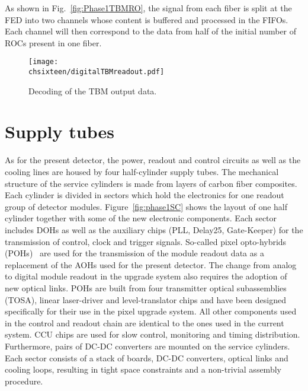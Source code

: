 As shown in Fig.~\ref{fig:Phase1TBMRO}, the signal from each fiber is split at the FED into two channels whose content is buffered and processed in the FIFOs.
Each channel will then correspond to the data from half of the initial number of ROCs present in one fiber.

\clearpage

\begin{figure}[!htb]
 \begin{center}
 \texttt{[image: \\chsixteen/digitalTBMreadout.pdf]}
 \end{center}
 \caption{Decoding of the TBM output data.}
 \label{fig:digTBMRO}
\end{figure}

\section{Supply tubes}

As for the present detector, the power, readout and control circuits as well as the cooling lines are housed by four half-cylinder supply tubes.
The mechanical structure of the service cylinders is made from layers of carbon fiber composites.
Each cylinder is divided in sectors which hold the electronics for one readout group of detector modules.
Figure~\ref{fig:phase1SC} shows the layout of one half cylinder together with some of the new electronic components.
Each sector includes DOHs as well as the auxiliary chips (PLL, Delay25, Gate-Keeper) for the transmission of control, clock and trigger signals.
So-called pixel opto-hybrids (POHs)~\cite{1748-0221-7-01-C01113} are used for the transmission of the module readout data as a replacement of the AOHs used for the present detector.
The change from analog to digital module readout in the upgrade system also requires the adoption of new optical links.
POHs are built from four transmitter optical subassemblies (TOSA), linear laser-driver and level-translator chips and have been designed specifically for their use in the pixel upgrade system.
All other components used in the control and readout chain are identical to the ones used in the current system. CCU chips are used for slow control, monitoring and timing distribution.
Furthermore, pairs of DC-DC converters are mounted on the service cylinders.
Each sector consists of a stack of boards, DC-DC converters, optical links and cooling loops, resulting in tight space constraints and a non-trivial assembly procedure.

